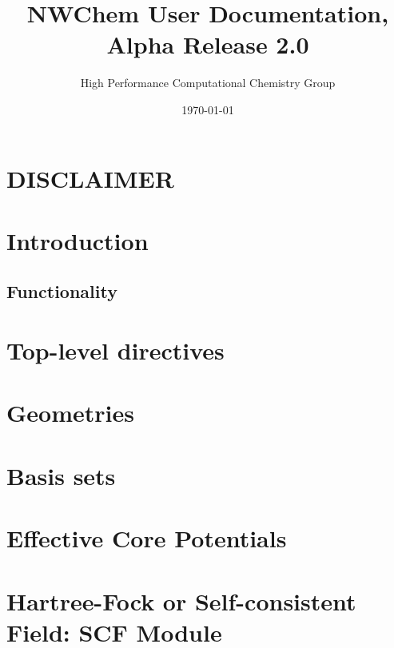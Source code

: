 \setlength{\parskip}{6pt}

\newcommand{\nwchemversion}{2.0}
\newcommand{\nwchemyear}{1996}





\title{\bf\Large NWChem User Documentation, Alpha Release \nwchemversion}
\author{High Performance Computational Chemistry Group}
\date{\today}
\maketitle

\section*{\center DISCLAIMER}


\clearpage

\tableofcontents

\clearpage

\section{Introduction}


\subsection{Functionality}


\section{Top-level directives}


\section{Geometries}


\section{Basis sets}


\section{Effective Core Potentials}


\section{Hartree-Fock or Self-consistent Field: SCF Module} 


